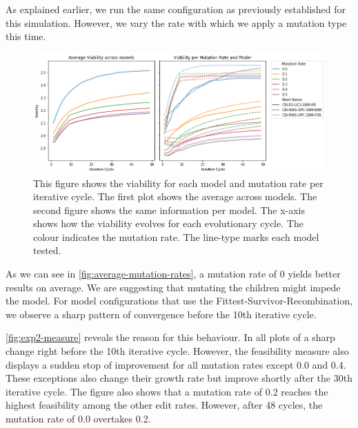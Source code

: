 \documentclass[./../../paper.tex]{subfiles}
\begin{document}
As explained earlier, we run the same configuration as previously established for this simulation. However, we vary the rate with which we apply a mutation type this time. 

\begin{figure}[htbp]
    \centering
    \includegraphics[width=\textwidth]{figures/generated/exp2_viability_by_mrate_model.png}
    \caption{This figure shows the viability for each model and mutation rate per iterative cycle. The first plot shows the average across models. The second figure shows the same information per model. The x-axis shows how the viability evolves for each evolutionary cycle. The colour indicates the mutation rate. The line-type marks each model tested.}
    \label{fig:average-mutation-rates}
\end{figure}


\noindent As we can see in \autoref{fig:average-mutation-rates}, a mutation rate of 0 yields better results on average. We are suggesting that mutating the children might impede the model. 
For model configurations that use the Fittest-Survivor-Recombination, we observe a sharp pattern of convergence before the 10th iterative cycle.  



\autoref{fig:exp2-measure} reveals the reason for this behaviour.
In all plots of a sharp change right before the 10th iterative cycle. However, the feasibility measure also displays a sudden stop of improvement for all mutation rates except 0.0 and 0.4. These exceptions also change their growth rate but improve shortly after the 30th iterative cycle. The figure also shows that a mutation rate of 0.2 reaches the highest feasibility among the other edit rates. However, after 48 cycles, the mutation rate of 0.0 overtakes 0.2.     
\end{document}
